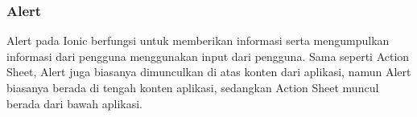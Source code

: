 \subsubsection{Alert}
Alert pada Ionic berfungsi untuk memberikan informasi serta mengumpulkan informasi dari pengguna menggunakan input dari pengguna. Sama seperti Action Sheet, Alert juga biasanya dimunculkan di atas konten dari aplikasi, namun Alert biasanya berada di tengah konten aplikasi, sedangkan Action Sheet muncul berada dari bawah aplikasi.





		
			
